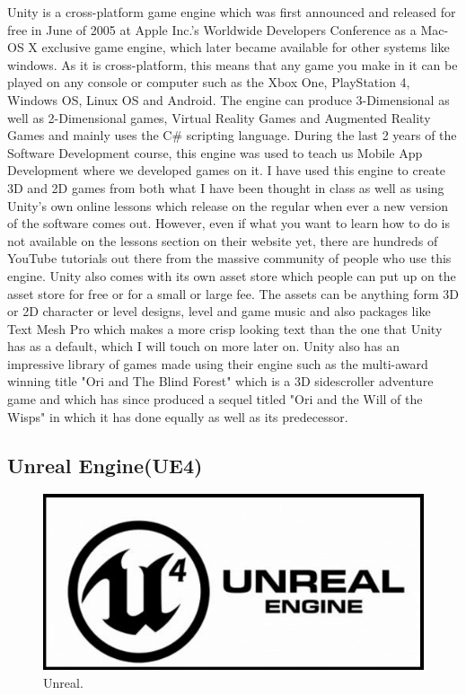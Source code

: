 Unity is a cross-platform game engine which was first announced and released for free in June of 2005 at Apple Inc.'s Worldwide Developers Conference as a Mac-OS X exclusive game engine, which later became available for other systems like windows. As it is cross-platform, this means that any game you make in it can be played on any console or computer such as the Xbox One, PlayStation 4, Windows OS, Linux OS and Android. The engine can produce 3-Dimensional as well as 2-Dimensional games, Virtual Reality Games and Augmented Reality Games and mainly uses the C\# scripting language. During the last 2 years of the Software Development course, this engine was used to teach us Mobile App Development where we developed games on it. I have used this engine to create 3D and 2D games from both what I have been thought in class as well as using Unity's own online lessons which release on the regular when ever a new version of the software comes out. However, even if what you want to learn how to do is not available on the lessons section on their website yet, there are hundreds of YouTube tutorials out there from the massive community of people who use this engine. 
Unity also comes with its own asset store which people can put up on the asset store for free or for a small or large fee. The assets can be anything form 3D or 2D character or level designs, level and game music and also packages like Text Mesh Pro which makes a more crisp looking text than the one that Unity has as a default, which I will touch on more later on.
Unity also has an impressive library of games made using their engine such as the multi-award winning title "Ori and The Blind Forest" which is a 3D sidescroller adventure game and which has since produced a sequel titled "Ori and the Will of the Wisps" in which it has done equally as well as its predecessor.\cite{Unity}
\newpage

\subsection{Unreal Engine(UE4)}
\begin{figure}[h]
  \includegraphics[width=\linewidth]{Images/Unreal-Engine-Logo.png}
  \caption{Unreal.}
  \label{fig:Unreal}
\end{figure}
\bigskip

